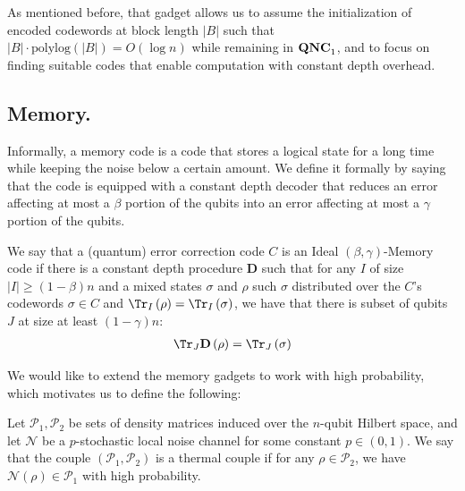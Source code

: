 \documentclass[manuscript,screen,review]{acmart}
\begin{document}
{As mentioned before, that gadget allows us to assume the initialization of encoded codewords at block length $|B|$ such that $|B| \cdot \text{polylog}(|B|) = O(\log n)$ while remaining in $\mathbf{QNC}_{1}{}$, and to focus on finding suitable codes that enable computation with constant depth overhead.


 \subsection{Memory.} 
 \newcommand*{\DD}{\mathbf{D} }
Informally, a memory code is a code that stores a logical state for a long time while keeping the noise below a certain amount. We define it formally by saying that the code is equipped with a constant depth decoder that reduces an error affecting at most a $\beta$ portion of the qubits into an error affecting at most a $\gamma$ portion of the qubits.

 \begin{definition}
   We say that a (quantum) error correction code $C$ is an Ideal $(\beta,\gamma)$-Memory code if there is a constant depth procedure $\DD$ such that for any $I$ of size $|I| \ge (1 - \beta) n$ and a mixed states $\sigma$ and $\rho$ such $\sigma$ distributed over the $C$'s codewords $\sigma \in C$ and $\Tr_{I}\left(\rho\right) = \Tr_{I}\left(\sigma\right)$, we have that there is subset of qubits $J$ at size at least $(1-\gamma)n$:
   \begin{equation*}
     \begin{split}
        \Tr_{J} \DD \left(\rho\right) = \Tr_{J}\left(\sigma\right) 
     \end{split}
   \end{equation*}

 \end{definition}
We would like to extend the memory gadgets to work with high probability, which motivates us to define the following:
\newcommand*{\Po}{\mathcal{P}_{1}}
\newcommand*{\Pt}{\mathcal{P}_{2}}
\newcommand*{\Nn}{\mathcal{N}}
\begin{definition}[ $\left(\Po,\Pt \right)$- thermal couple. ]
Let $\Po,\Pt$ be sets of density matrices induced over the $n$-qubit Hilbert space, and let $\Nn$ be a $p$-stochastic local noise channel for some constant $p \in (0,1)$. We say that the couple $\left(\Po,\Pt \right)$ is a thermal couple if for any $\rho \in \Pt$, we have $\Nn(\rho) \in \Po$ with high probability.
\end{definition}

}
\end{document}
